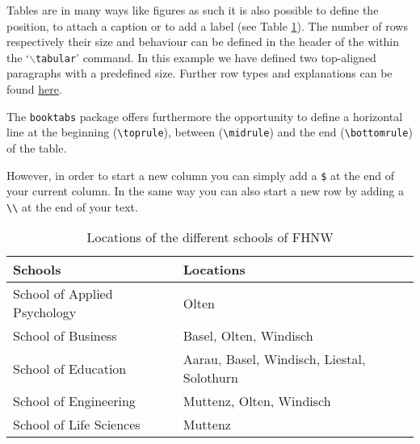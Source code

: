Tables are in many ways like figures as such it is also possible to define the position, to attach a caption or to add a label (see Table \ref{table:FHNWLocations}). The number of rows respectively their size and behaviour can be defined in the header of the within the `$\backslash$\texttt{tabular}' command. In this example we have defined two top-aligned paragraphs with a predefined size. Further row types and explanations can be found \href{http://en.wikibooks.org/wiki/LaTeX/Tables}{here}. 

The \texttt{booktabs} package offers furthermore the opportunity to define a horizontal line at the beginning (\verb!\toprule!), between (\verb!\midrule!) and the end (\verb!\bottomrule!) of the table. 

However, in order to start a new column you can simply add a \texttt{\$} at the end of your current column. In the same way you can also start a new row by adding a \verb!\\! at the end of your text.

\begin{table}[!h]
    \begin{tabular}{p{5cm} p{8cm}}

    \toprule
    
    \textbf{Schools} & \textbf{Locations}\\
    
    \midrule
    
    School of Applied Psychology & 
    Olten\\
    
    \midrule
    
    School of Business &
    Basel, Olten, Windisch\\
    
    \midrule
    
    School of Education &
    Aarau, Basel, Windisch, Liestal, Solothurn\\
    
    \midrule
    
    School of Engineering &
    Muttenz, Olten, Windisch\\
    
    \midrule
    
    School of Life Sciences &
    Muttenz\\
    
    \bottomrule
                         
    \end{tabular}
  \caption{Locations of the different schools of FHNW}
  \label{table:FHNWLocations}
\end{table}

